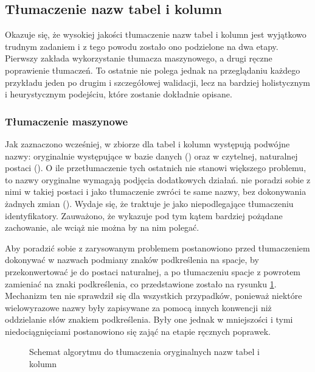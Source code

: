 \subsection{Tłumaczenie nazw tabel i kolumn}
\label{text:schema-translation}
Okazuje się, że wysokiej jakości tłumaczenie nazw tabel i kolumn jest wyjątkowo trudnym zadaniem i z tego powodu zostało ono podzielone na dwa etapy. Pierwszy zakłada wykorzystanie tłumacza maszynowego, a drugi ręczne poprawienie tłumaczeń. To ostatnie nie polega jednak na przeglądaniu każdego przykładu jeden po drugim i szczegółowej walidacji, lecz na bardziej holistycznym i heurystycznym podejściu, które zostanie dokładnie opisane.


\subsubsection{Tłumaczenie maszynowe}
Jak zaznaczono wcześniej, w zbiorze  dla tabel i kolumn występują podwójne nazwy: oryginalnie występujące w bazie danych () oraz w czytelnej, naturalnej postaci (). O ile przetłumaczenie tych ostatnich nie stanowi większego problemu, to nazwy oryginalne wymagają podjęcia dodatkowych działań.  nie poradzi sobie z nimi w takiej postaci i jako tłumaczenie zwróci te same nazwy, bez dokonywania żadnych zmian (\mbox{}). Wydaje się, że traktuje je jako niepodlegające tłumaczeniu identyfikatory. Zauważono, że  wykazuje pod tym kątem bardziej pożądane zachowanie, ale wciąż nie można by na nim polegać. 

Aby poradzić sobie z zarysowanym problemem postanowiono przed tłumaczeniem dokonywać w nazwach podmiany znaków podkreślenia na spacje, by przekonwertować je do postaci naturalnej, a po tłumaczeniu spacje z powrotem zamieniać na znaki podkreślenia, co przedstawione zostało na rysunku \ref{fig:multi-word-translation}. Mechanizm ten nie sprawdził się dla wszystkich przypadków, ponieważ niektóre wielowyrazowe nazwy były zapisywane za pomocą innych konwencji niż oddzielanie słów znakiem podkreślenia. Były one jednak w mniejszości i tymi niedociągnięciami postanowiono się zająć na etapie ręcznych poprawek.

\begin{figure}[ht!]
  \centering
  
  \caption{Schemat algorytmu do tłumaczenia oryginalnych nazw tabel i kolumn}
  \label{fig:multi-word-translation}
\end{figure}

